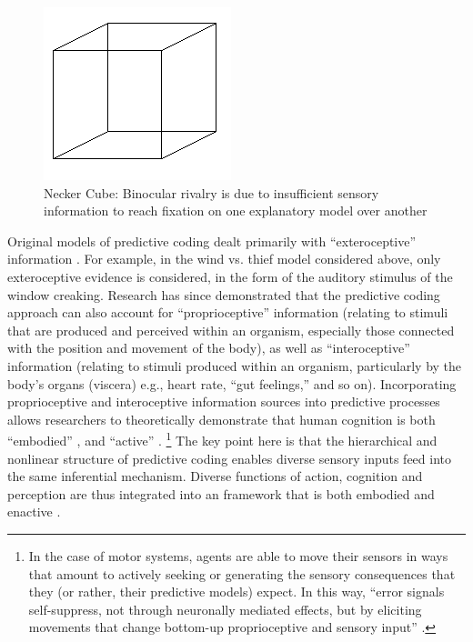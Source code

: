 \begin{CJK}{UTF8}{gbsn}
\begin{figure}[htbp]
  \begin{center}
    \includegraphics[scale=.7]{images/Necker_cube.png}
      \caption{Necker Cube: Binocular rivalry is due to insufficient sensory information to reach fixation on one explanatory model over another}
        \label{fig:neckerCube}
   \end{center}
\end{figure}

Original models of predictive coding dealt primarily with ``exteroceptive'' information \citep[relating to stimuli that are external to an organism, i.e. visual, auditory, haptic perception][]{Rao1999,Friston2010}.  For example, in the wind vs. thief model considered above, only exteroceptive evidence is considered, in the form of the auditory stimulus of the window creaking.  Research has since demonstrated that the predictive coding approach can also account for ``proprioceptive'' information (relating to stimuli that are produced and perceived within an organism, especially those connected with the position and movement of the body), as well as ``interoceptive'' information (relating to stimuli produced within an organism, particularly by the body's organs (viscera) e.g., heart rate, ``gut feelings,'' and so on).  Incorporating proprioceptive and interoceptive information sources into predictive processes allows researchers to theoretically demonstrate that human cognition is both ``embodied'' \citep[inference is rooted in and contingent upon visceral, interoceptive information ][]{Pezzulo2014}, and ``active'' \citep[in the sense that humans can move throughout the environment to reduce the discrepancy between proprioceptive predictions and actual body states][]{Friston2010,Clark2015}.
  \footnote{In the case of motor systems, agents are able to move their sensors in ways that amount to actively seeking or generating the sensory consequences that they (or rather, their predictive models) expect.  In this way, ``error signals self-suppress, not through neuronally mediated effects, but by eliciting movements that change bottom-up proprioceptive and sensory input''  \citep[][1349]{Friston2003}.}
The key point here is that the hierarchical and nonlinear structure of predictive coding enables diverse sensory inputs feed into the same inferential mechanism.  Diverse functions of action, cognition and perception are thus integrated into an framework that is both embodied and enactive \citep{Friston2015}.


\end{CJK}
